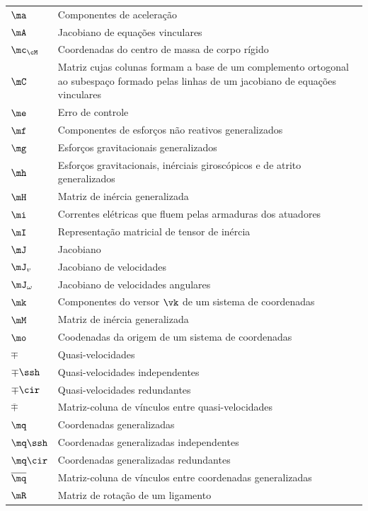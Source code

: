 \documentclass[]{politex}
\begin{document}
\begin{longtable}{lp{}}
  $\ma$ & Componentes de aceleração \\
  $\mA$ & Jacobiano de equações vinculares \\
  $\mc_{\cM}$ & Coordenadas do centro de massa de corpo rígido \\
  $\mC$ & Matriz cujas colunas formam a base de um complemento ortogonal ao subespaço formado pelas linhas de um jacobiano de equações vinculares  \\
  $\me$ & Erro de controle \\
  $\mf$ & Componentes de esforços não reativos generalizados \\
  $\mg$ & Esforços gravitacionais generalizados \\
  $\mh$ & Esforços gravitacionais, inérciais giroscópicos e de atrito generalizados \\
  $\mH$ & Matriz de inércia generalizada \\
  $\mi$ & Correntes elétricas que fluem pelas armaduras dos atuadores \\ 
  $\mI$ & Representação matricial de tensor de inércia \\
  $\mJ$ & Jacobiano \\
  $\mJ_v$ & Jacobiano de velocidades \\
  $\mJ_\omega$ & Jacobiano de velocidades angulares \\
  $\mk$ & Componentes do versor $\vk$ de um sistema de coordenadas \\
  $\mM$ & Matriz de inércia generalizada \\
  $\mo$ & Coodenadas da origem de um sistema de coordenadas \\
  $\mp$ & Quasi-velocidades \\
  $\mp\ssh$ & Quasi-velocidades independentes \\
  $\mp\cir$ & Quasi-velocidades redundantes \\
  $\overline{\mp}$ & Matriz-coluna de vínculos entre quasi-velocidades \\
  $\mq$ & Coordenadas generalizadas \\
  $\mq\ssh$ & Coordenadas generalizadas independentes \\
  $\mq\cir$ & Coordenadas generalizadas redundantes \\
  $\overline{\mq}$ & Matriz-coluna de vínculos entre coordenadas generalizadas \\
  $\mR$ & Matriz de rotação de um ligamento \\

\end{longtable}
\end{document}
